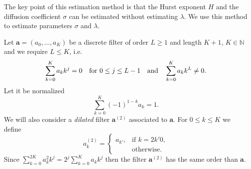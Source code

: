 \documentclass[smallextended]{svjour3}
\newcommand{\IN}{{\mathbb N}}
\begin{document}
    The key point of this estimation method is that the Hurst exponent $H$ 
    and the diffusion coefficient $\sigma $ can be estimated without
    estimating $\lambda$.  We use this method to estimate parameters
    $\sigma$ and $\lambda$.

    Let $\bm{a} = (a_0,\ldots, a_K )$ be a discrete filter of order $L\ge 1$ and
    length $K+1$, $K \in\IN$ and we require  $L\le K$, i.e.
    \[
        \sum_{k=0}^K a_k k^j =0 
        \quad 
        \hbox{\rm  for } 
        0 \le j \le  L-1 
        \quad 
        \hbox{\rm and} 
        \quad  
        \sum_{k=0}^K a_k k^L \ne 0.
    \]
    Let it be normalized
    \[
        \sum_{k=0}^K (-1)^{1-k} a_k =1.
    \]
    We will also consider a {\it dilated} 
    filter $\bm{a}^{(2)}$ associated to $\bm{a}$. 
    For $0\le k\le K$ we define
    \[
        a_k^{(2)} = 
        \begin{cases} 
            a_{k'}, 
            & \mbox{if } k=2k' 0,
            \\
            & \mbox{otherwise.}
        \end{cases}
    \]
    Since $\sum_{k=0}^{2K} a_k^2 k^j=2^j \sum_{k=0}^K a_k k^j $ 
    then the filter $\bm{a}^{(2)}$ has the same order than  $\bm{a}$.
\end{document}
